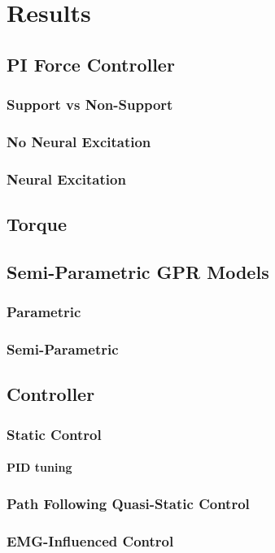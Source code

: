 \chapter{Results}
\section{PI Force Controller}

\subsection{Support vs Non-Support}
\subsection{No Neural Excitation}
\subsection{Neural Excitation}
\section{Torque}
\section{Semi-Parametric GPR Models}
\subsection{Parametric}
\subsection{Semi-Parametric}
\section{Controller}
\subsection{Static Control}
\subsubsection{PID tuning}
\subsection{Path Following Quasi-Static Control}
\subsection{EMG-Influenced Control}
